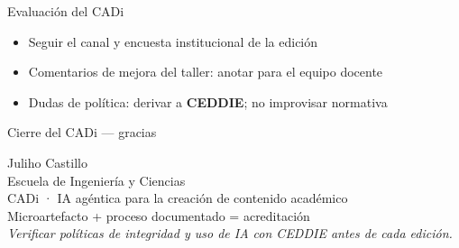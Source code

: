 \documentclass[aspectratio=169,11pt]{beamer}
\begin{document}
\begin{frame}{Evaluación del CADi}
\begin{itemize}
\item Seguir el canal y encuesta institucional de la edición
\item Comentarios de mejora del taller: anotar para el equipo docente
\item Dudas de política: derivar a \textbf{CEDDIE}; no improvisar normativa
\end{itemize}
\end{frame}

\begin{frame}{Cierre del CADi --- gracias}
\begin{center}
{\Large Juliho Castillo}\\[0.5em]
Escuela de Ingeniería y Ciencias\\[1em]
CADi · IA agéntica para la creación de contenido académico\\[1em]
{\large Microartefacto + proceso documentado = acreditación}\\[1.5em]
{\small \emph{Verificar políticas de integridad y uso de IA con CEDDIE antes de cada edición.}}
\end{center}
\end{frame}
\end{document}
